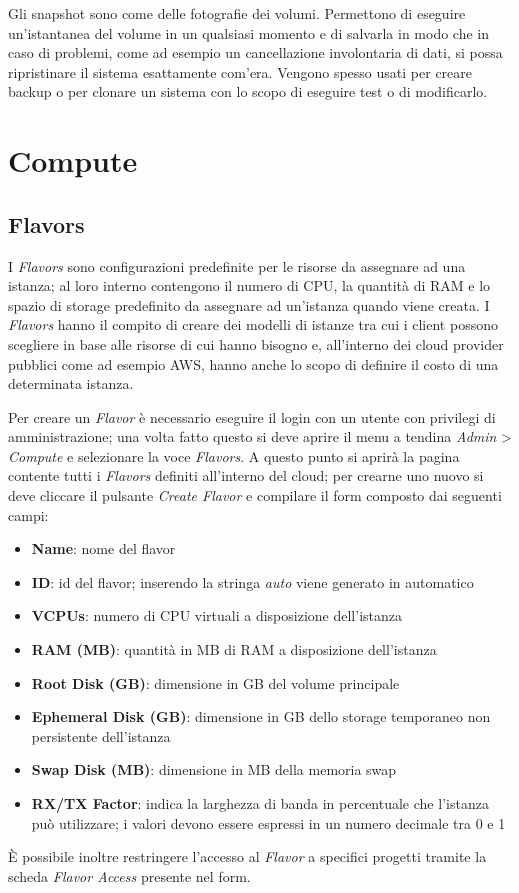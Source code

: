 Gli snapshot sono come delle fotografie dei volumi. Permettono di eseguire un'istantanea del volume in un qualsiasi momento e di salvarla in modo che in caso di problemi, come ad esempio un cancellazione involontaria di dati, si possa ripristinare il sistema esattamente com'era. Vengono spesso usati per creare backup o per clonare un sistema con lo scopo di eseguire test o di modificarlo.

\section{Compute}

\subsection{Flavors}\label{sec:flavor}

I \textit{Flavors} sono configurazioni predefinite per le risorse da assegnare ad una istanza; al loro interno contengono il numero di CPU, la quantità di RAM e lo spazio di storage predefinito da assegnare ad un'istanza quando viene creata. I \textit{Flavors} hanno il compito di creare dei modelli di istanze tra cui i client possono scegliere in base alle risorse di cui hanno bisogno e, all'interno dei cloud provider pubblici come ad esempio AWS, hanno anche lo scopo di definire il costo di una determinata istanza.

Per creare un \textit{Flavor} è necessario eseguire il login con un utente con privilegi di amministrazione; una volta fatto questo si deve aprire il menu a tendina \textit{Admin} > \textit{Compute} e selezionare la voce \textit{Flavors}. A questo punto si aprirà la pagina contente tutti i \textit{Flavors} definiti all'interno del cloud; per crearne uno nuovo si deve cliccare il pulsante \emph{Create Flavor} e compilare il form composto dai seguenti campi:
\begin{itemize}
    \item \textbf{Name}: nome del flavor
    \item \textbf{ID}: id del flavor; inserendo la stringa \emph{auto} viene generato in automatico
    \item \textbf{VCPUs}: numero di CPU virtuali a disposizione dell'istanza
    \item \textbf{RAM (MB)}: quantità in MB di RAM a disposizione dell'istanza
    \item \textbf{Root Disk (GB)}: dimensione in GB del volume principale
    \item \textbf{Ephemeral Disk (GB)}: dimensione in GB dello storage temporaneo non persistente dell'istanza
    \item \textbf{Swap Disk (MB)}: dimensione in MB della memoria swap
    \item \textbf{RX/TX Factor}: indica la larghezza di banda in percentuale che l'istanza può utilizzare; i valori devono essere espressi in un numero decimale tra 0 e 1
\end{itemize}
È possibile inoltre restringere l'accesso al \textit{Flavor} a specifici progetti tramite la scheda \emph{Flavor Access} presente nel form.


